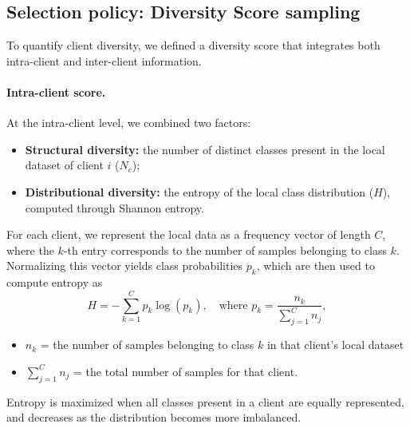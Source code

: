 \documentclass[10pt,twocolumn,letterpaper]{article}
\begin{document}
  





























\subsection{Selection policy: Diversity Score sampling}

\noindent To quantify client diversity, we defined a diversity score that integrates both intra-client and inter-client information. 

\paragraph{Intra-client score.} 
At the intra-client level, we combined two factors: 

\begin{itemize}
    \item \textbf{Structural diversity:} the number of distinct classes present in the local dataset of client \(i\) (\(N_c\));
    \item \textbf{Distributional diversity:} the entropy of the local class distribution (\(H\)), 
    computed through Shannon entropy.
\end{itemize}

\noindent For each client, we represent the local data as a frequency 
vector of length \(C\), where the \(k\)-th entry corresponds to the number of samples belonging 
to class \(k\). Normalizing this vector yields class probabilities \(p_k\), which are then used 
to compute entropy as
\[
H = - \sum_{k=1}^C p_k \log(p_k), 
\quad \text{where } p_k = \frac{n_k}{\sum_{j=1}^C n_j},
\]
\begin{itemize}
\item \(n_k\) = the number of samples belonging to class \(k\) in that client’s local dataset
\item \(\sum_{j=1}^C n_j\) = the total number of samples for that client.

\end{itemize}
Entropy is maximized when all classes present in a client are equally represented, and decreases 
as the distribution becomes more imbalanced.
\end{document}
